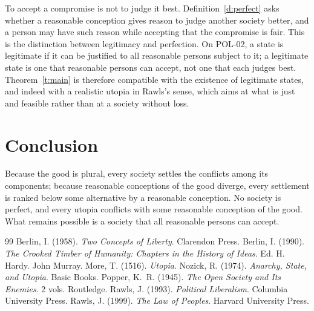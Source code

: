 \documentclass{situationist-preprint}
\begin{document}
\begin{reply}
To accept a compromise is not to judge it best. Definition~\ref{d:perfect} asks whether a reasonable conception gives reason to judge another society better, and a person may have such reason while accepting that the compromise is fair. This is the distinction between legitimacy and perfection. On POL-02, a state is legitimate if it can be justified to all reasonable persons subject to it; a legitimate state is one that reasonable persons can accept, not one that each judges best. Theorem~\ref{t:main} is therefore compatible with the existence of legitimate states, and indeed with a realistic utopia in Rawls's sense, which aims at what is just and feasible rather than at a society without loss.
\end{reply}

\section{Conclusion}

Because the good is plural, every society settles the conflicts among its components; because reasonable conceptions of the good diverge, every settlement is ranked below some alternative by a reasonable conception. No society is perfect, and every utopia conflicts with some reasonable conception of the good. What remains possible is a society that all reasonable persons can accept.

\begin{thebibliography}{99}\small
{} Berlin, I. (1958). \emph{Two Concepts of Liberty}. Clarendon Press.
 Berlin, I. (1990). \emph{The Crooked Timber of Humanity: Chapters in the History of Ideas}. Ed. H. Hardy. John Murray.
 More, T. (1516). \emph{Utopia}.
 Nozick, R. (1974). \emph{Anarchy, State, and Utopia}. Basic Books.
 Popper, K.~R. (1945). \emph{The Open Society and Its Enemies}. 2 vols. Routledge.
 Rawls, J. (1993). \emph{Political Liberalism}. Columbia University Press.
 Rawls, J. (1999). \emph{The Law of Peoples}. Harvard University Press.
\end{thebibliography}
\end{document}

